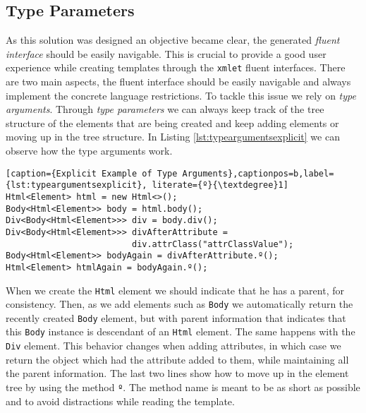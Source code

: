 \subsection{Type Parameters}
\label{sec:typeparameters}

As this solution was designed an objective became clear, the generated \textit{fluent interface} should be easily navigable. This is crucial to provide a good user experience while creating templates through the \texttt{xmlet} fluent interfaces. There are two main aspects, the fluent interface should be easily navigable and always implement the concrete language restrictions. To tackle this issue we rely on \textit{type arguments}. Through \textit{type parameters} we can always keep track of the tree structure of the elements that are being created and keep adding elements or moving up in the tree structure. In Listing \ref{lst:typeargumentsexplicit} we can observe how the type arguments work. 

\bigskip


\begin{minipage}{\linewidth}
\begin{lstlisting}[caption={Explicit Example of Type Arguments},captionpos=b,label={lst:typeargumentsexplicit}, literate={º}{\textdegree}1]
Html<Element> html = new Html<>();
Body<Html<Element>> body = html.body();
Div<Body<Html<Element>>> div = body.div();
Div<Body<Html<Element>>> divAfterAttribute = 
                         div.attrClass("attrClassValue");
Body<Html<Element>> bodyAgain = divAfterAttribute.º();
Html<Element> htmlAgain = bodyAgain.º();
\end{lstlisting}
\end{minipage}

\noindent
When we create the \texttt{Html} element we should indicate that he has a parent, for consistency. Then, as we add elements such as \texttt{Body} we automatically return the recently created \texttt{Body} element, but with parent information that indicates that this \texttt{Body} instance is descendant of an \texttt{Html} element. The same happens with the \texttt{Div} element. This behavior changes when adding attributes, in which case we return the object which had the attribute added to them, while maintaining all the parent information. The last two lines show how to move up in the element tree by using the method \texttt{º}. The method name is meant to be as short as possible and to avoid distractions while reading the template. 

